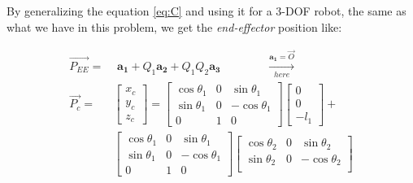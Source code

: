 \documentclass[conference]{IEEEtran}
\begin{document}
By generalizing the equation \ref{eq:C} and using it for a 3-DOF robot, the same as what we have in this problem, we get the \textit{end-effector }position like:
\begin{small}
    \begin{align*}
        \vec{\mathbf{\mathit{P_{EE}}}} = & \,\, \mathbf{a_1} + Q_1 \mathbf{a_2} + Q_1 Q_2 \mathbf{a_3} \quad \quad \quad \quad \xrightarrow[here]{\mathbf{a_1} = \vec{\mathit{O}}} \\
        \vec{\mathbf{\mathit{P_c}}} =    & \begin{bmatrix}
                                               x_c \\
                                               y_c \\
                                               z_c
                                           \end{bmatrix}
        = \begin{bmatrix}
              \cos \theta_1 & 0 & \sin \theta_1   \\
              \sin \theta_1 & 0 & - \cos \theta_1 \\
              0             & 1 & 0
          \end{bmatrix} \begin{bmatrix}
                            0 \\
                            0 \\
                            -l_1
                        \end{bmatrix} +                                                                                                                                      \\
                                         & \begin{bmatrix}
                                               \cos \theta_1 & 0 & \sin \theta_1   \\
                                               \sin \theta_1 & 0 & - \cos \theta_1 \\
                                               0             & 1 & 0
                                           \end{bmatrix} \begin{bmatrix}
                                                             \cos \theta_2 & 0 & \sin \theta_2   \\
                                                             \sin \theta_2 & 0 & - \cos \theta_2 \\

\end{bmatrix}
\end{align*}
\end{small}
\end{document}
